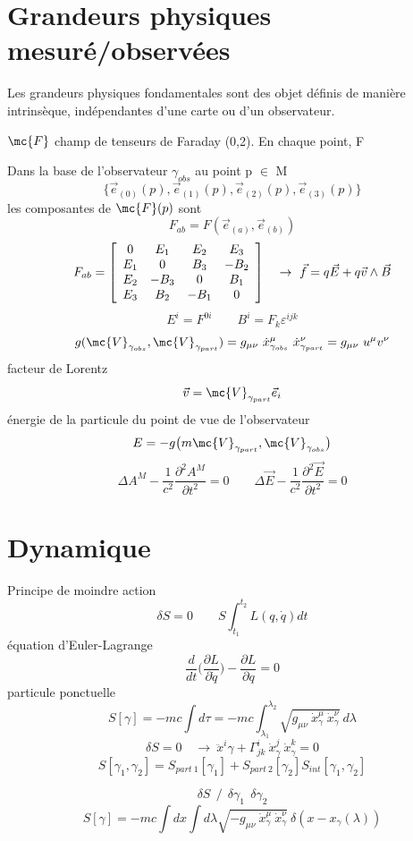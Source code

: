 \section{Grandeurs physiques mesuré/observées}
Les grandeurs physiques fondamentales sont des objet définis de manière intrinsèque, indépendantes d'une carte ou d'un observateur.

$\mc{F}$ champ de tenseurs de Faraday (0,2). En chaque point, F

Dans la base de l'observateur $\gamma_{obs}$ au point p $\in$ M
\[
\{\vec{e}_{(0)}(p),\vec{e}_{(1)}(p),\vec{e}_{(2)}(p),\vec{e}_{(3)}(p)\}
\]
les composantes de $\mc{F}(p)$ sont
\[
F_{ab}=F(\vec{e}_{(a)},\vec{e}_{(b)})
\]
\[
F_{ab}=\left[
\begin{array}{ c c c c }
 0 & E_1 & E_2 & E_3 \\ 
 E_1 & 0 & B_3 & -B_2 \\ 
 E_2 & -B_3 & 0 & B_1 \\ 
 E_3 & B_2 & -B_1 & 0 \\ 
\end{array}
\right]\quad\to\ \vec{f}=q\vec{E}+q\vec{v}\wedge\vec{B}
\]
\[
E^i=F^{0i}\qquad B^i=F_k\varepsilon^{ijk}
\]
\[
g(\mc{V}_{\gamma_{obs}},\mc{V}_{\gamma_{part}}) = g_{\mu\nu}\ \dot
x^\mu_{\gamma_{obs}}\ \dot x^\nu_{\gamma_{part}} = g_{\mu\nu}\ u^\mu v^\nu
\]
facteur de Lorentz
\[
\vec{v} = \mc{V}_{\gamma_{part}}\vec e_{i}
\]
énergie de la particule du point de vue de l'observateur
\[
E=-g\big(m\mc{V}_{\gamma_{part}},\mc{V}_{\gamma_{obs}}\big)
\]
\[
\Delta A^M-\frac{1}{c^2}\frac{\partial^2A^M}{\partial t^2}=0
\qquad \Delta \vec E-\frac{1}{c^2}\frac{\partial^2\vec E}{\partial t^2}=0
\]
\[\]
\[\]
\section{Dynamique}
Principe de moindre action
\[
\delta S=0\qquad S\int^{t_2}_{t_1}L(q,\dot q)dt
\]
équation d'Euler-Lagrange
\[
\frac{d}{dt}\big(\frac{\partial L}{\partial\dot q}\big)-
\frac{\partial L}{\partial q}=0
\]
particule ponctuelle
\[
S[\gamma]=-mc\int d\tau=-mc\int^{\lambda_2}_{\lambda_1}\sqrt{g_{\mu\nu}
\ \dot x^\mu_\gamma\ \dot x^\nu_\gamma}\ d\lambda
\]
\[
\delta S=0\quad \to\ \ddot x^i\gamma +\Gamma^i_{jk}
\ \dot x^j_\gamma\ \dot x^k_\gamma=0
\]
\[
S[\gamma_1,\gamma_2]=S_{part\ 1}[\gamma_1]
+S_{part\ 2}[\gamma_2]S_{int}[\gamma_1,\gamma_2]
\]

\[
\delta S \ \ / \ \ \delta\gamma_1\ \ \delta\gamma_2
\]
\[
S[\gamma]=-mc\int dx\int d\lambda\sqrt{-g_{\mu\nu}\ \dot x^\mu_\gamma
\ \dot x^\nu_\gamma}\ \delta(x-x_\gamma(\lambda))
\]

